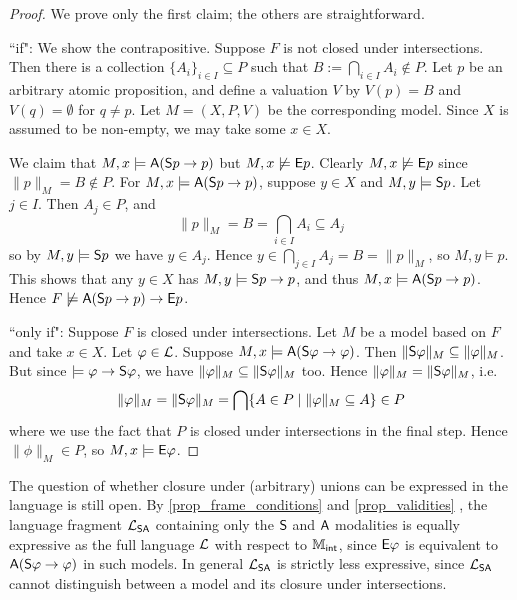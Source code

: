 \begin{proof}

    We prove only the first claim; the others are straightforward.

    ``if": We show the contrapositive. Suppose $F$ is not closed under
    intersections. Then there is a collection $\{A_i\}_{i \in I} \subseteq P$
    such that $B := \bigcap_{i \in I}A_i \notin P$. Let $p$ be an arbitrary
    atomic proposition, and define a valuation $V$ by $V(p) = B$ and $V(q) =
    \emptyset$ for $q \ne p$. Let $M = (X, P, V)$ be the corresponding model.
    Since $X$ is assumed to be non-empty, we may take some $x \in X$.

    We claim that $M, x \models \A(\S p \limplies p)$ but $M, x
    \not\models \E p$. Clearly $M, x \not\models \E p$ since
    $\|p\|_M = B \notin P$. For $M, x \models \A(\S p \limplies
    p)$, suppose $y \in X$ and $M, y \models \S p$. Let $j
    \in I$. Then $A_j \in P$, and
    \[
        \|p\|_M
        = B
        = \bigcap_{i \in I}{A_i}
        \subseteq A_j
    \]
    so by $M, y \models \S p$ we have $y \in A_j$. Hence $y
    \in \bigcap_{j \in I}A_j = B = \|p\|_M$, so $M, y \models p$. This
    shows that any $y \in X$ has $M, y \models \S p \limplies p$,
    and thus $M, x \models \A(\S p \limplies p)$. Hence $F
    \not\models \A(\S p \limplies p) \limplies \E p$.

    ``only if": Suppose $F$ is closed under intersections. Let $M$
    be a model based on $F$ and take $x \in X$. Let $\phi
    \in \cL$. Suppose $M, x \models \A(\S\phi \limplies \phi)$. Then
    $\|\S\phi\|_M \subseteq \|\phi\|_M$. But since $\models \phi
    \limplies \S\phi$, we have $\|\phi\|_M \subseteq \|\S\phi\|_M$ too.
    Hence $\|\phi\|_M = \|\S\phi\|_M$, i.e.
    \[
        \|\phi\|_M
        = \|\S\phi\|_M
        = \bigcap\{A \in P \mid \|\phi\|_M \subseteq A\}
        \in P
    \]
    where we use the fact that $P$ is closed under intersections in the
    final step. Hence $\|\phi\|_M \in P$, so $M, x \models
    \E\phi$.

\end{proof}

The question of whether closure under (arbitrary) unions can be expressed in
the language is still open. By \cref{prop_frame_conditions}
 and \cref{prop_validities}
, the language fragment $\cLSA$ containing only the $\S$
and $\A$ modalities is equally expressive as the full language $\cL$ with
respect to $\Mint$, since $\E\phi$ is equivalent to $\A(\S\phi \limplies \phi)$
in such models. In general $\cLSA$ is strictly less expressive, since $\cLSA$
cannot distinguish between a model and its closure under intersections.

